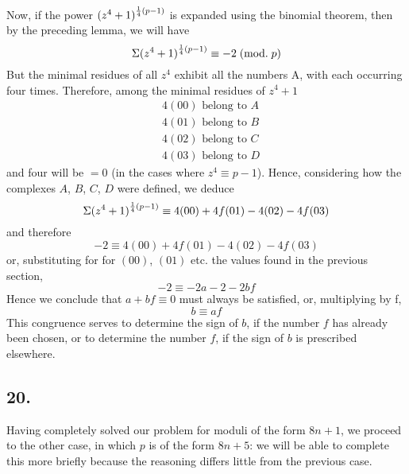 \documentclass[twoside,12pt]{memoir}
\renewcommand{\pmod}[1]{\;(\textrm{mod.}\;#1)}
\let\oldfrac\frac
\def\frac#1#2{\mathchoice{\tfrac{#1}{#2}}{\oldfrac{#1}{#2}}{\genfrac{}{}{}{2}{#1}{#2\mathstrut}}{\genfrac{}{}{}{3}{#1}{#2\mathstrut}}}
\begin{document}
Now, if the power \((z^{4}+1)^{\frac{1}{4}(p-1)}\) is expanded using the binomial theorem, then by the preceding lemma, we will have
\[\Sigma(z^{4}+1)^{\frac{1}{4}(p-1)} \equiv-2\pmod{p}\]
But the minimal residues of all \(z^{4}\) exhibit all the numbers A, with each occurring four times. Therefore, among the minimal residues of \(z^{4}+1\)
\[\begin{aligned}
& 4(00) \text{ belong to } A \\
& 4(01) \text{ belong to } B \\
& 4(02) \text{ belong to } C \\
& 4(03) \text{ belong to } D
\end{aligned}\]
and four will be \(=0\) (in the cases where \(z^{4} \equiv p-1\)). Hence, considering how the complexes \(A\), \(B\), \(C\), \(D\) were defined, we deduce
\[\Sigma(z^{4}+1)^{\frac{1}{4}(p-1)} \equiv 4(00)+4 f(01)-4(02)-4 f(03)\]
and therefore
\[-2 \equiv 4(00)+4 f(01)-4(02)-4 f(03)\]
or, substituting for for \((00)\), \((01)\) etc{.} the values found in the previous section,
\[-2 \equiv-2 a-2-2 b f\]
Hence we conclude that \(a+b f \equiv 0 \) must always be satisfied, or, multiplying by f,
\[b \equiv a f\]
This congruence serves to determine the sign of \(b\), if the number \(f\) has already been chosen, or to determine the number \(f\), if the sign of \(b\) is prescribed elsewhere.

\subsection*{20.}

Having completely solved our problem for moduli of the form \(8n+1\), we proceed to the other case, in which \(p\) is of the form \(8n+5\): we will be able to complete this more briefly because the reasoning differs little from the previous case.
\end{document}
